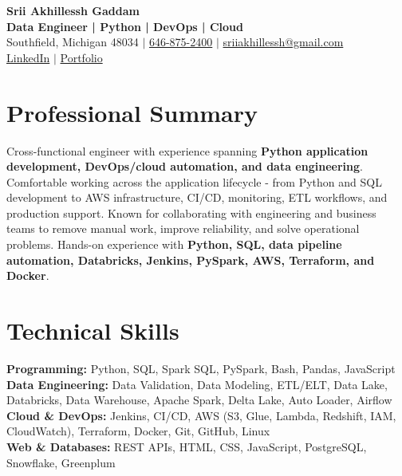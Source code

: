 \documentclass[letterpaper,10pt]{article}
\begin{document}
\fontsize{9.35pt}{10.45pt}\selectfont

\begin{center}
    {\LARGE \textbf{Srii Akhillessh Gaddam}} \\[-1pt]
    \textbf{Data Engineer | Python | DevOps | Cloud} \\[2pt]
    Southfield, Michigan 48034 $|$
    \href{tel:6468752400}{646-875-2400} $|$
    \href{mailto:sriiakhillessh@gmail.com}{sriiakhillessh@gmail.com} \\[1pt]
    \href{https://www.linkedin.com/in/srii-akhiilessh-gaddam-b48668191/}{LinkedIn} $|$
    \href{https://sriiakhillesshg.github.io/portfolio/}{Portfolio}
\end{center}
\vspace{-8pt}

\section{Professional Summary}
\small{Cross-functional engineer with experience spanning \textbf{Python application development, DevOps/cloud automation, and data engineering}. Comfortable working across the application lifecycle - from Python and SQL development to AWS infrastructure, CI/CD, monitoring, ETL workflows, and production support. Known for collaborating with engineering and business teams to remove manual work, improve reliability, and solve operational problems. Hands-on experience with \textbf{Python, SQL, data pipeline automation, Databricks, Jenkins, PySpark, AWS, Terraform, and Docker}.}

\section{Technical Skills}
\small{
\textbf{Programming:} Python, SQL, Spark SQL, PySpark, Bash, Pandas, JavaScript \\
\textbf{Data Engineering:} Data Validation, Data Modeling, ETL/ELT, Data Lake, Databricks, Data Warehouse, Apache Spark, Delta Lake, Auto Loader, Airflow \\
\textbf{Cloud \& DevOps:} Jenkins, CI/CD, AWS (S3, Glue, Lambda, Redshift, IAM, CloudWatch), Terraform, Docker, Git, GitHub, Linux \\
\textbf{Web \& Databases:} REST APIs, HTML, CSS, JavaScript, PostgreSQL, Snowflake, Greenplum
}
\end{document}
